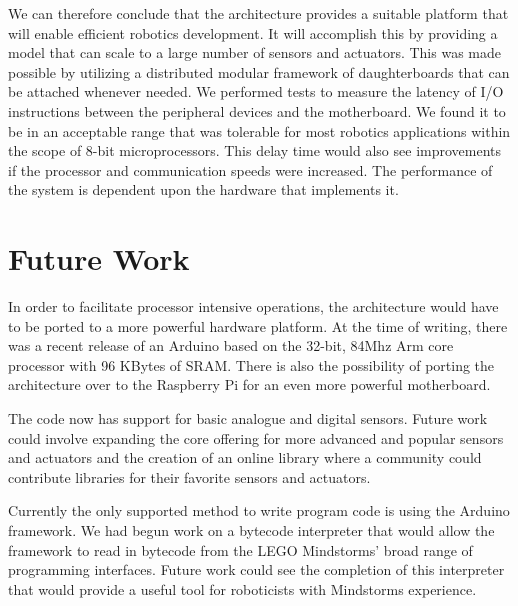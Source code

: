 We can therefore conclude that the \xten architecture provides a suitable platform that will enable efficient robotics development. It will accomplish this by providing a model that can scale to a large number of sensors and actuators. This was made possible by utilizing a distributed modular framework of daughterboards that can be attached whenever needed. We performed tests to measure the latency of I/O instructions between the peripheral devices and the motherboard. We found it to be in an acceptable range that was tolerable for most robotics applications within the scope of 8-bit microprocessors. This delay time would also see improvements if the processor and communication speeds were increased. The performance of the system is dependent upon the hardware that implements it.

\section{Future Work}
In order to facilitate processor intensive operations, the architecture would have to be ported to a more powerful hardware platform. At the time of writing, there was a recent release of an Arduino based on the 32-bit, 84Mhz Arm core processor with 96 KBytes of SRAM. There is also the possibility of porting the architecture over to the Raspberry Pi for an even more powerful motherboard.

The code now has support for basic analogue and digital sensors. Future work could involve expanding the core offering for more advanced and popular sensors and actuators and the creation of an online library where a community could contribute libraries for their favorite sensors and actuators.

Currently the only supported method to write program code is using the Arduino framework. We had begun work on a bytecode interpreter that would allow the \xten framework to read in bytecode from the LEGO Mindstorms' broad range of programming interfaces. Future work could see the completion of this interpreter that would provide a useful tool for roboticists with Mindstorms experience.